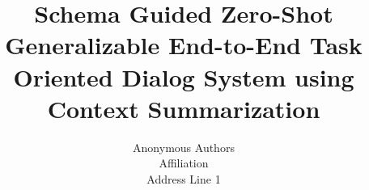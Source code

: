 \documentclass[letterpaper]{article}
\title{Schema Guided Zero-Shot Generalizable End-to-End Task Oriented Dialog System using Context Summarization}
\author{Anonymous Authors\\
    Affiliation\\
    Address Line 1\\
}
\begin{document}
\maketitle
\begin{abstract}
    \begin{quote}
        
    \end{quote}
\end{abstract}










\end{document}
